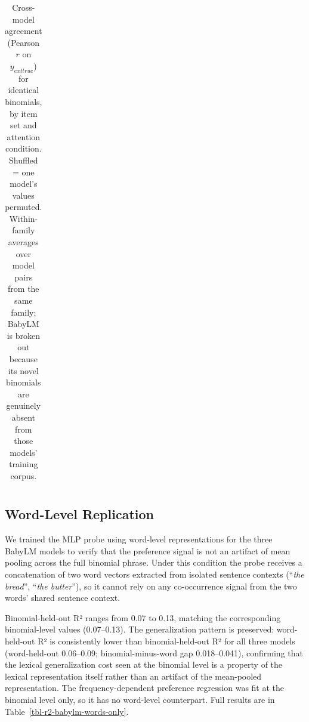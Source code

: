 \documentclass[11pt]{article}
\begin{document}
\begin{longtable}[t]{lllll}
\caption{\label{tbl-agreement}Cross-model agreement (Pearson \(r\) on
\(y_{   ext{true}}\)) for identical binomials, by item set and attention
condition. Shuffled = one model's values permuted. Within-family
averages over model pairs from the same family; BabyLM is broken out
because its novel binomials are genuinely absent from those models'
training corpus.}

\tabularnewline
\end{longtable}

\endgroup{}

\subsection{Word-Level Replication}\label{sec-appendix-words-only-exp1}

We trained the MLP probe using word-level representations for the three
BabyLM models to verify that the preference signal is not an artifact of
mean pooling across the full binomial phrase. Under this condition the
probe receives a concatenation of two word vectors extracted from
isolated sentence contexts (``\emph{the bread}'', ``\emph{the
butter}''), so it cannot rely on any co-occurrence signal from the two
words' shared sentence context.

Binomial-held-out R² ranges from 0.07 to 0.13, matching the
corresponding binomial-level values (0.07--0.13). The generalization
pattern is preserved: word-held-out R² is consistently lower than
binomial-held-out R² for all three models (word-held-out 0.06--0.09;
binomial-minus-word gap 0.018--0.041), confirming that the lexical
generalization cost seen at the binomial level is a property of the
lexical representation itself rather than an artifact of the mean-pooled
representation. The frequency-dependent preference regression was fit at
the binomial level only, so it has no word-level counterpart. Full
results are in Table~\ref{tbl-r2-babylm-words-only}.

\begingroup\fontsize{8}{10}\selectfont
\end{document}
